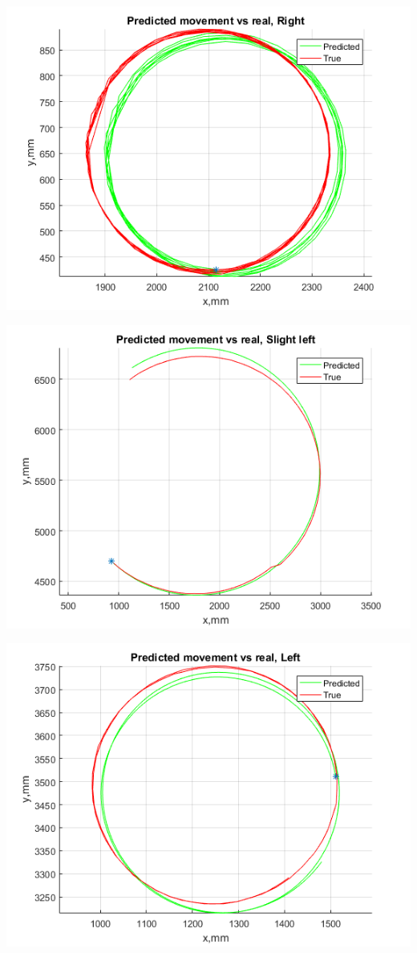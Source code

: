 \documentclass[a4paper, 12pt]{article}
\begin{document}
\includegraphics[scale = 0.8]{rra.png}




\includegraphics[scale = 0.8]{la.png}


\includegraphics[scale = 0.8]{lla.png}
\end{document}

